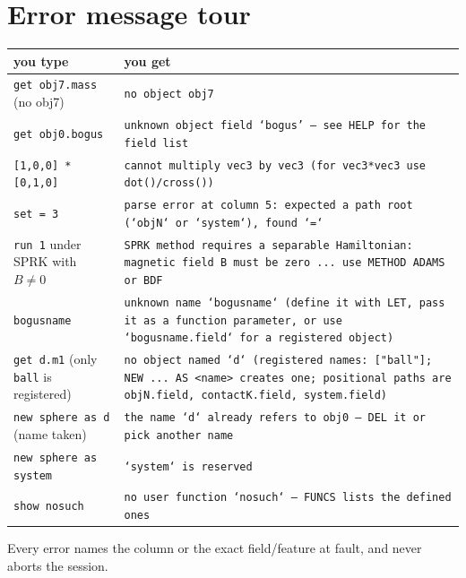 \documentclass[11pt]{article}
\newcommand{\code}[1]{\texttt{#1}}
\begin{document}
\section{Error message tour}

\begin{center}
\begin{tabular}{p{5.4cm}p{9.2cm}}
\textbf{you type} & \textbf{you get}\\\hline
\code{get obj7.mass} (no obj7) & \code{no object obj7}\\
\code{get obj0.bogus} & \code{unknown object field `bogus' --- see HELP for the field list}\\
\code{[1,0,0] * [0,1,0]} & \code{cannot multiply vec3 by vec3 (for vec3*vec3 use dot()/cross())}\\
\code{set = 3} & \code{parse error at column 5: expected a path root (`objN` or `system`), found `=`}\\
\code{run 1} under SPRK with $B\ne0$ & \code{SPRK method requires a separable Hamiltonian: magnetic field B must be zero ... use METHOD ADAMS or BDF}\\
\code{bogusname} & \code{unknown name `bogusname` (define it with LET, pass it as a function parameter, or use `bogusname.field` for a registered object)}\\
\code{get d.m1} (only \code{ball} is registered) & \code{no object named `d` (registered names: ["ball"]; NEW ... AS <name> creates one; positional paths are objN.field, contactK.field, system.field)}\\
\code{new sphere as d} (name taken) & \code{the name `d` already refers to obj0 --- DEL it or pick another name}\\
\code{new sphere as system} & \code{`system` is reserved}\\
\code{show nosuch} & \code{no user function `nosuch` --- FUNCS lists the defined ones}\\
\end{tabular}
\end{center}

Every error names the column or the exact field/feature at fault, and
never aborts the session.
\end{document}
